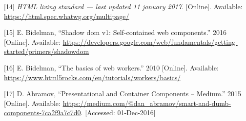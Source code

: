 \documentclass[]{article}
\begin{document}
\hypertarget{ref-HTML}{}
{[}14{]} \emph{HTML living standard --- last updated 11 january 2017}.
{[}Online{]}. Available: \url{https://html.spec.whatwg.org/multipage/}

\hypertarget{ref-Bidelman2016shadow}{}
{[}15{]} E. Bidelman, ``Shadow dom v1: Self-contained web components.''
2016 {[}Online{]}. Available:
\url{https://developers.google.com/web/fundamentals/getting-started/primers/shadowdom}

\hypertarget{ref-Bidelman2010}{}
{[}16{]} E. Bidelman, ``The basics of web workers.'' 2010 {[}Online{]}.
Available: \url{https://www.html5rocks.com/en/tutorials/workers/basics/}

\hypertarget{ref-Abramov2015}{}
{[}17{]} D. Abramov, ``Presentational and Container Components --
Medium.'' 2015 {[}Online{]}. Available:
\url{https://medium.com/@dan_abramov/smart-and-dumb-components-7ca2f9a7c7d0}.
{[}Accessed: 01-Dec-2016{]}
\end{document}
